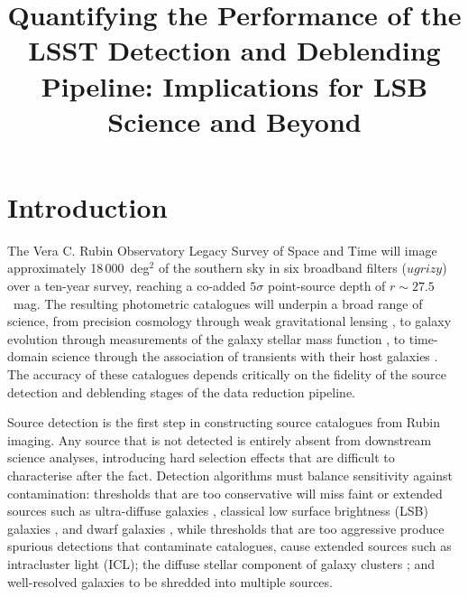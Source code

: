 \documentclass[DM,lsstdraft,authoryear,toc]{lsstdoc}
\title{Quantifying the Performance of the LSST Detection and Deblending Pipeline: Implications for LSB Science and Beyond}
\date{\vcsDate}
\begin{document}
\maketitle

\section{Introduction}
\label{sec:introduction}

The Vera C. Rubin Observatory Legacy Survey of Space and Time \citep[][]{Ivezic2019}
will image approximately 18\,000~deg$^2$ of
the southern sky in six broadband filters ($ugrizy$) over a ten-year survey,
reaching a co-added $5\sigma$ point-source depth of $r \sim 27.5$~mag. The
resulting photometric catalogues will underpin a broad range of science, from
precision cosmology through weak gravitational lensing
\citep[e.g.][]{LSST_DESC2018,Mandelbaum2018}, to galaxy evolution through
measurements of the galaxy stellar mass function
\citep[GSMF; e.g.][]{Baldry2012,Kelvin2014}, to time-domain science through
the association of transients with their host galaxies
\citep[e.g.][]{Foley2013}. The accuracy of these catalogues depends
critically on the fidelity of the source detection and deblending stages of
the data reduction pipeline.

Source detection is the first step
in constructing source catalogues from Rubin imaging. Any source that is not detected is entirely absent
from downstream science analyses, introducing hard selection effects that are
difficult to characterise after the fact. Detection algorithms must balance
sensitivity against contamination: thresholds that are too conservative will
miss faint or extended sources such as ultra-diffuse galaxies
\citep[UDGs;][]{vanDokkum2015}, classical low surface brightness (LSB)
galaxies \citep[e.g.][]{ImpeyBothun1997}, and dwarf galaxies
\citep[e.g.][]{Benson2003,Martin2019}, while thresholds that are too
aggressive produce spurious detections that contaminate catalogues,
cause extended sources such as intracluster
light (ICL); the diffuse stellar component of galaxy clusters
\citep[e.g.][]{Montes2019}; and well-resolved galaxies to be shredded into multiple sources.
\end{document}

